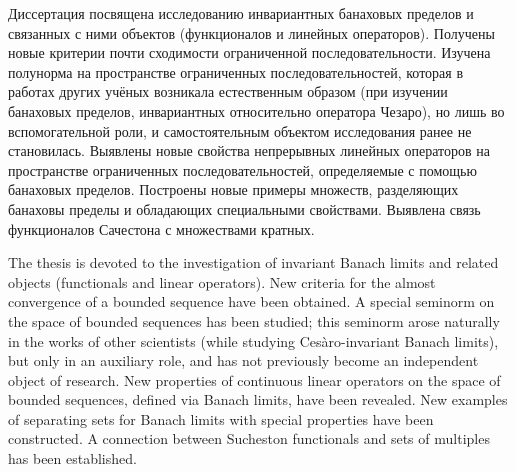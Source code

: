 {}


Диссертация посвящена исследованию инвариантных банаховых пределов и связанных с ними объектов
(функционалов и линейных операторов).
Получены новые критерии почти сходимости ограниченной последовательности.
Изучена полунорма на пространстве ограниченных последовательностей,
которая в работах других учёных возникала естественным образом
(при изучении банаховых пределов, инвариантных относительно оператора Чезаро),
но лишь во вспомогательной роли, и самостоятельным объектом исследования ранее не становилась.
Выявлены новые свойства непрерывных линейных операторов на пространстве ограниченных последовательностей,
определяемые с помощью банаховых пределов.
Построены новые примеры множеств, разделяющих банаховы пределы и обладающих специальными свойствами.
Выявлена связь функционалов Сачестона с множествами кратных.


{}


The thesis is devoted to the investigation of invariant Banach limits and related objects (functionals and linear operators).
New criteria for the almost convergence of a bounded sequence have been obtained.
A special seminorm on the space of bounded sequences has been studied;
this seminorm arose naturally in the works of other scientists (while studying Cesàro-invariant Banach limits),
but only in an auxiliary role, and has not previously become an independent object of research.
New properties of continuous linear operators on the space of bounded sequences, defined via Banach limits, have been revealed.
New examples of separating sets for Banach limits with special properties have been constructed.
A connection between Sucheston functionals and sets of multiples has been established.
